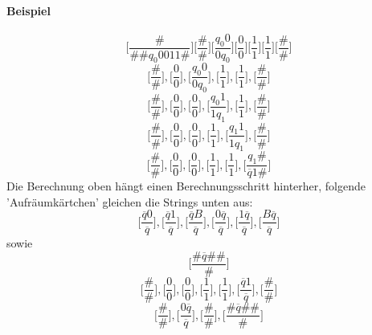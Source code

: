 \paragraph*{Beispiel} $$ \Big[ \frac{\#}{\#\#q_0 0011\#} \Big]\Big[ \frac{\#}{\#} \Big]\Big[ \frac{q_0 0}{0 q_0} \Big]\Big[ \frac{0}{0} \Big]\Big[ \frac{1}{1} \Big]\Big[ \frac{1}{1} \Big]\Big[ \frac{\#}{\#} \Big] $$
$$ \Big[ \frac{\#}{\#} \Big], \Big[ \frac{0}{0} \Big], \Big[ \frac{q_0 0}{0q_0} \Big], \Big[ \frac{1}{1} \Big], \Big[ \frac{1}{1} \Big], \Big[ \frac{\#}{\#} \Big] $$
$$ \Big[ \frac{\#}{\#} \Big], \Big[ \frac{0}{0} \Big], \Big[ \frac{0}{0} \Big], \Big[ \frac{q_0 1}{1q_1} \Big], \Big[ \frac{1}{1} \Big], \Big[ \frac{\#}{\#} \Big] $$
$$ \Big[ \frac{\#}{\#} \Big], \Big[ \frac{0}{0} \Big], \Big[ \frac{0}{0} \Big], \Big[ \frac{1}{1} \Big], \Big[ \frac{q_1 1}{1q_1} \Big], \Big[ \frac{\#}{\#} \Big] $$
$$ \Big[ \frac{\#}{\#} \Big], \Big[ \frac{0}{0} \Big], \Big[ \frac{0}{0} \Big], \Big[ \frac{1}{1} \Big], \Big[ \frac{1}{1} \Big], \Big[ \frac{q_1\#}{\overline{q}1\#} \Big] $$
Die Berechnung oben hängt einen Berechnungsschritt hinterher, folgende 'Aufräumkärtchen' gleichen die Strings unten aus: $$ \Big[ \frac{\overline{q}0}{\overline{q}} \Big], \Big[ \frac{\overline{q}1}{\overline{q}} \Big], \Big[ \frac{\overline{q}B}{\overline{q}} \Big], \Big[ \frac{0\overline{q}}{\overline{q}} \Big], \Big[ \frac{1\overline{q}}{\overline{q}} \Big], \Big[ \frac{B\overline{q}}{\overline{q}} \Big] $$ sowie $$\Big[ \frac{\#\overline{q}\#\#}{\#} \Big]$$
$$ \Big[ \frac{\#}{\#} \Big], \Big[ \frac{0}{0} \Big], \Big[ \frac{0}{0} \Big], \Big[ \frac{1}{1} \Big], \Big[ \frac{1}{1} \Big], \Big[ \frac{\overline{q}1}{\overline{q}} \Big], \Big[ \frac{\#}{\#} \Big] $$
$$ \Big[ \frac{\#}{\#} \Big], \Big[ \frac{0\overline{q}}{\overline{q}} \Big], \Big[ \frac{\#}{\#} \Big], \Big[ \frac{\#\overline{q}\#\#}{\#} \Big] $$